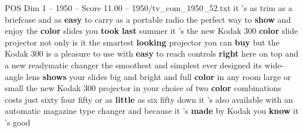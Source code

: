 \begin{textsample}{POS Dim 1 – 1950 – Score 11.00 – 1950/tv\_com\_1950\_52.txt}  \label{ex:f1_pos_004}
it 's as trim as a briefcase and as \textbf{easy} to carry as a portable radio the perfect way to \textbf{show} and enjoy the \textbf{color} slides you \textbf{took} \textbf{last} summer it 's the new Kodak 300 \textbf{color} slide projector not only is it the smartest \textbf{looking} projector you can \textbf{buy} but the Kodak 300 is a pleasure to use with \textbf{easy} to reach controls \textbf{right} here on top and a new readymatic changer the smoothest and simplest ever designed its wide-angle lens \textbf{shows} your slides big and bright and full \textbf{color} in any room large or small the new Kodak 300 projector in your choice of two \textbf{color} combinations costs just sixty four fifty or as \textbf{little} as six fifty down it 's also available with an automatic magazine type changer and because it 's \textbf{made} by Kodak you \textbf{know} it 's good

\end{textsample}
